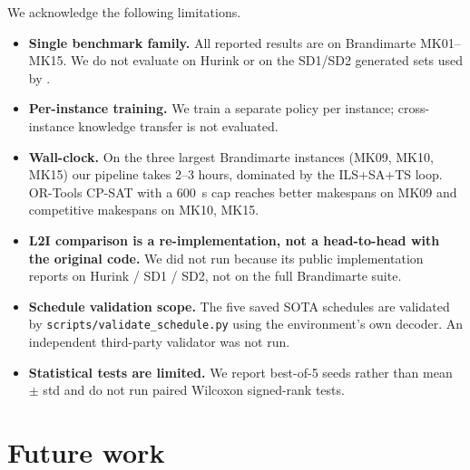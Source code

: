 \documentclass[preprint,review,3p,times,twocolumn]{elsarticle}
\begin{document}
We acknowledge the following limitations.
\begin{itemize}
  \item \textbf{Single benchmark family.} All reported
        results are on Brandimarte MK01--MK15. We do not
        evaluate on Hurink or on the SD1/SD2 generated
        sets used by \citet{Xiao2026RESCHED}.
  \item \textbf{Per-instance training.} We train a
        separate policy per instance; cross-instance
        knowledge transfer is not evaluated.
  \item \textbf{Wall-clock.} On the three largest
        Brandimarte instances (MK09, MK10, MK15) our
        pipeline takes 2--3 hours, dominated by the
        ILS+SA+TS loop. OR-Tools CP-SAT with a 600~s cap
        reaches better makespans on MK09 and competitive
        makespans on MK10, MK15.
  \item \textbf{L2I comparison is a re-implementation, not
        a head-to-head with the original code.} We did not
        run \citet{Xiao2026RESCHED} because its public
        implementation reports on Hurink / SD1 / SD2, not
        on the full Brandimarte suite.
  \item \textbf{Schedule validation scope.} The five saved
        SOTA schedules are validated by
        \texttt{scripts/validate\_schedule.py} using the
        environment's own decoder. An independent
        third-party validator was not run.
  \item \textbf{Statistical tests are limited.} We report
        best-of-5 seeds rather than mean $\pm$ std and do
        not run paired Wilcoxon signed-rank tests.
\end{itemize}

\section{Future work}
\label{sec:future}
\end{document}
